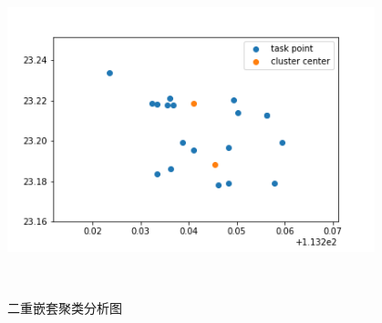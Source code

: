 \begin{figure}
\begin{minipage}[c]{0.3\textwidth}
        \label{fig:sample-figure-b}
    \end{minipage}
    \begin{minipage}[c]{0.3\textwidth}
        \centering
        \includegraphics[width=0.95\textwidth]{141.png}
        \label{fig:sample-figure-c}
    \end{minipage}\\
    \caption{二重嵌套聚类分析图}
    \label{fig:sample-figure}
\end{figure}

